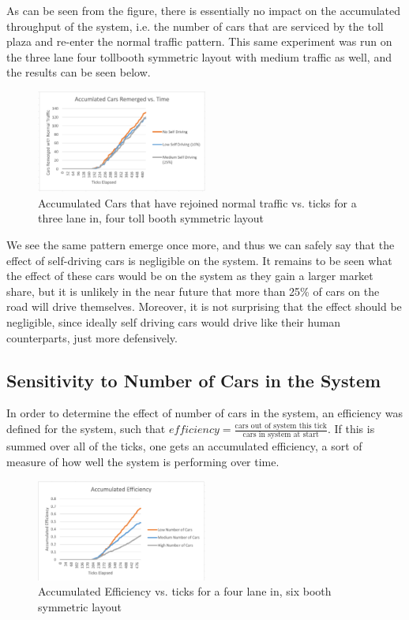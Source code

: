 \documentclass{article}
\begin{document}
As can be seen from the figure, there is essentially no impact on the accumulated throughput of the system, i.e. the number of cars that are serviced by the toll plaza and re-enter the normal traffic pattern. This same experiment was run on the three lane four tollbooth symmetric layout with medium traffic as well, and the results can be seen below.

\begin{figure}[H]
    \centering
    \includegraphics[width=0.5\textwidth]{SDSA2.PNG}
    \caption[width=0.8\textwidth]{Accumulated Cars that have rejoined normal traffic vs. ticks for a three lane in, four toll booth symmetric layout}
\end{figure}

We see the same pattern emerge once more, and thus we can safely say that the effect of self-driving cars is negligible on the system. It remains to be seen what the effect of these cars would be on the system as they gain a larger market share, but it is unlikely in the near future that more than 25\% of cars on the road will drive themselves. Moreover, it is not surprising that the effect should be negligible, since ideally self driving cars would drive like their human counterparts, just more defensively.

\subsection{Sensitivity to Number of Cars in the System}
In order to determine the effect of number of cars in the system, an efficiency was defined for the system, such that $efficiency = \frac{\text{cars out of system this tick}}{\text{cars in system at start}}$. If this is summed over all of the ticks, one gets an accumulated efficiency, a sort of measure of how well the system is performing over time.

\begin{figure}[H]
    \centering
    \includegraphics[width=0.5\textwidth]{numcarSA.PNG}
    \caption[width=0.8\textwidth]{Accumulated Efficiency vs. ticks for a four lane in, six booth symmetric layout}
\end{figure}
\end{document}
